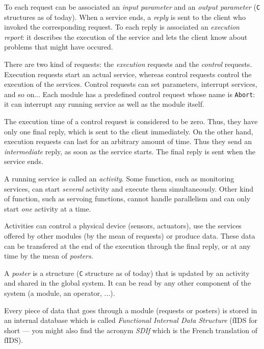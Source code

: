 To each request can  be associated an {\em  input parameter} and an  {\em
output parameter} ({\tt C} structures as  of today). When a service ends,
a   {\em  reply} is sent to   the   client who invoked  the corresponding
request. To  each reply  is  associated an  {\em  execution  report}:  it
describes the execution of  the service and  lets  the client  know about
problems that might have occured.

There are two kind of requests: the {\em execution} requests and the {\em
control} requests. Execution requests  start  an actual service,  whereas
control requests control the  execution of the services. Control requests
can set parameters,  interrupt services, and so  on... Each module has  a
predefined control request whose name  is  {\tt Abort}: it can  interrupt
any running service as well as the module itself.

The execution time of  a control request  is considered to be zero. Thus,
they have only one final reply, which is  sent to the client immediately.
On the other hand, execution requests can last for an arbitrary amount of
time. Thus they send an {\em intermediate} reply,  as soon as the service
starts.  The final reply is sent when the service ends.

A running  service is called an   {\em activity}. Some function,  such as
monitoring services,  can start {\em several}  activity and  execute them
simultaneously. Other  kind   of function,  such as   servoing functions,
cannot handle  parallelism  and can only  start  {\em one} activity at  a
time.

Activities can control a physical   device (sensors, actuators), use  the
services offered by  other modules (by  the mean of  requests) or produce
data. These data can  be transfered at the end  of the  execution through
the final reply, or at any time by the mean of {\em posters}.

A {\em  poster} is a structure ({\tt  C} structure as  of  today) that is
updated by an activity and shared in the global system. It can be read by
any other component of the system (a module, an operator, ...).

Every piece  of data that goes through  a module (requests or posters) is
stored  in an internal database  which is called {\em Functional Internal
Data Structure} (fIDS  for short --- you might  also find the acronym
{\em SDIf} which is the French translation of fIDS).



